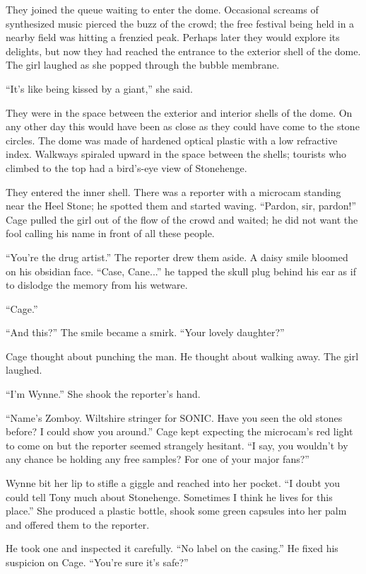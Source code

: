 They joined the queue waiting to enter the dome. Occasional screams of synthesized music pierced the buzz of the crowd; the free festival being held in a nearby field was hitting a frenzied peak. Perhaps later they would explore its delights, but now they had reached the entrance to the exterior shell of the dome. The girl laughed as she popped through the bubble membrane.

``It's like being kissed by a giant,'' she said.

They were in the space between the exterior and interior shells of the dome. On any other day this would have been as close as they could have come to the stone circles. The dome was made of hardened optical plastic with a low refractive index. Walkways spiraled upward in the space between the shells; tourists who climbed to the top had a bird's-eye view of Stonehenge.

They entered the inner shell. There was a reporter with a microcam standing near the Heel Stone; he spotted them and started waving. ``Pardon, sir, pardon!'' Cage pulled the girl out of the flow of the crowd and waited; he did not want the fool calling his name in front of all these people.

``You're the drug artist.'' The reporter drew them aside. A daisy smile bloomed on his obsidian face. ``Case, Cane...'' he tapped the skull plug behind his ear as if to dislodge the memory from his wetware.

``Cage.''

``And this?'' The smile became a smirk. ``Your lovely daughter?''

Cage thought about punching the man. He thought about walking away. The girl laughed.

``I'm Wynne.'' She shook the reporter's hand.

``Name's Zomboy. Wiltshire stringer for SONIC. Have you seen the old stones before? I could show you around.'' Cage kept expecting the microcam's red light to come on but the reporter seemed strangely hesitant. ``I say, you wouldn't by any chance be holding any free samples? For one of your major fans?''

Wynne bit her lip to stifle a giggle and reached into her pocket. ``I doubt you could tell Tony much about Stonehenge. Sometimes I think he lives for this place.'' She produced a plastic bottle, shook some green capsules into her palm and offered them to the reporter.

He took one and inspected it carefully. ``No label on the casing.'' He fixed his suspicion on Cage. ``You're sure it's safe?''

